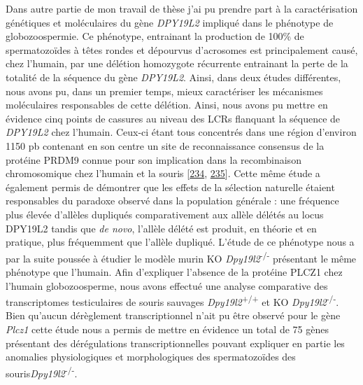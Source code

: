 \documentclass[12pt,a4paper,twoside]{ugathesis}
\theoremstyle{definition}
\theoremstyle{definition}
\theoremstyle{definition}
\theoremstyle{remark}
\begin{document}
Dans autre partie de mon travail de thèse j'ai pu prendre part à la
caractérisation génétiques et moléculaires du gène \emph{DPY19L2}
impliqué dans le phénotype de globozoospermie. Ce phénotype, entrainant
la production de 100\% de spermatozoïdes à têtes rondes et dépourvus
d'acrosomes est principalement causé, chez l'humain, par une délétion
homozygote récurrente entrainant la perte de la totalité de la séquence
du gène \emph{DPY19L2}. Ainsi, dans deux études différentes, nous avons
pu, dans un premier temps, mieux caractériser les mécanismes
moléculaires responsables de cette délétion. Ainsi, nous avons pu mettre
en évidence cinq points de cassures au niveau des LCRs flanquant la
séquence de \emph{DPY19L2} chez l'humain. Ceux-ci étant tous concentrés
dans une région d'environ 1150 pb contenant en son centre un site de
reconnaissance consensus de la protéine PRDM9 connue pour son
implication dans la recombinaison chromosomique chez l'humain et la
souris {[}\protect\hyperlink{ref-Parvanov2010}{234},
\protect\hyperlink{ref-Baudat2010}{235}{]}. Cette même étude a également
permis de démontrer que les effets de la sélection naturelle étaient
responsables du paradoxe observé dans la population générale : une
fréquence plus élevée d'allèles dupliqués comparativement aux allèle
délétés au locus DPY19L2 tandis que \emph{de novo}, l'allèle délété est
produit, en théorie et en pratique, plus fréquemment que l'allèle
dupliqué. L'étude de ce phénotype nous a par la suite poussée à étudier
le modèle murin KO \emph{Dpy19l2}\textsuperscript{-/-} présentant le
même phénotype que l'humain. Afin d'expliquer l'absence de la protéine
PLCZ1 chez l'humain globozoosperme, nous avons effectué une analyse
comparative des transcriptomes testiculaires de souris sauvages
\emph{Dpy19l2}\textsuperscript{+/+} et KO
\emph{Dpy19l2}\textsuperscript{-/-}. Bien qu'aucun dérèglement
transcriptionnel n'ait pu être observé pour le gène \emph{Plcz1} cette
étude nous a permis de mettre en évidence un total de 75 gènes
présentant des dérégulations transcriptionnelles pouvant expliquer en
partie les anomalies physiologiques et morphologiques des spermatozoïdes
des souris\emph{Dpy19l2}\textsuperscript{-/-}.
\end{document}

